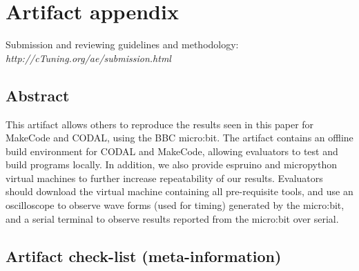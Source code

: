 \appendix
\pagebreak

\section{Artifact appendix}

Submission and reviewing guidelines and methodology: \\
{\em http://cTuning.org/ae/submission.html}

\subsection{Abstract}

This artifact allows others to reproduce the results seen in this paper for MakeCode and CODAL, using the BBC micro:bit. The artifact contains an offline build environment for CODAL and MakeCode, allowing evaluators to test and build programs locally. In addition, we also provide espruino and micropython virtual machines to further increase repeatability of our results. Evaluators should download the virtual machine containing all pre-requisite tools, and use an oscilloscope to observe wave forms (used for timing) generated by the micro:bit, and a serial terminal to observe results reported from the micro:bit over serial.


\subsection{Artifact check-list (meta-information)}

